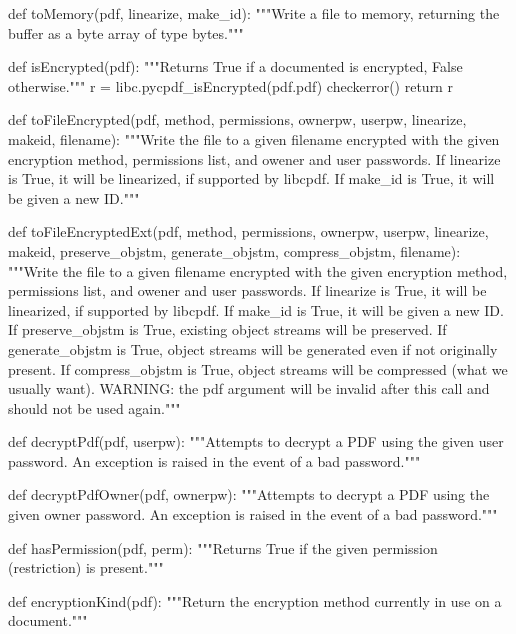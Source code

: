 def toMemory(pdf, linearize, make_id):
    """Write a file to memory, returning the buffer as a byte array of type
    bytes."""

def isEncrypted(pdf):
    """Returns True if a documented is encrypted, False otherwise."""
    r = libc.pycpdf_isEncrypted(pdf.pdf)
    checkerror()
    return r

def toFileEncrypted(pdf, method, permissions, ownerpw, userpw, linearize,
                    makeid, filename):
    """Write the file to a given filename encrypted with the given encryption
    method, permissions list, and owener and user passwords. If linearize is
    True, it will be linearized, if supported by libcpdf. If make_id is True,
    it will be given a new ID."""

def toFileEncryptedExt(pdf, method, permissions, ownerpw, userpw, linearize,
                       makeid, preserve_objstm, generate_objstm,
                       compress_objstm, filename):
    """Write the file to a given filename encrypted with the given encryption
    method, permissions list, and owener and user passwords. If linearize is
    True, it will be linearized, if supported by libcpdf. If make_id is True,
    it will be given a new ID. If preserve_objstm is True, existing object
    streams will be preserved. If generate_objstm is True, object streams will
    be generated even if not originally present. If compress_objstm is True,
    object streams will be compressed (what we usually want). WARNING: the pdf
    argument will be invalid after this call and should not be used again."""

def decryptPdf(pdf, userpw):
    """Attempts to decrypt a PDF using the given user password. An exception is
    raised in the event of a bad password."""

def decryptPdfOwner(pdf, ownerpw):
    """Attempts to decrypt a PDF using the given owner password. An exception
    is raised in the event of a bad password."""

def hasPermission(pdf, perm):
    """Returns True if the given permission (restriction) is present."""

def encryptionKind(pdf):
    """Return the encryption method currently in use on a document."""
